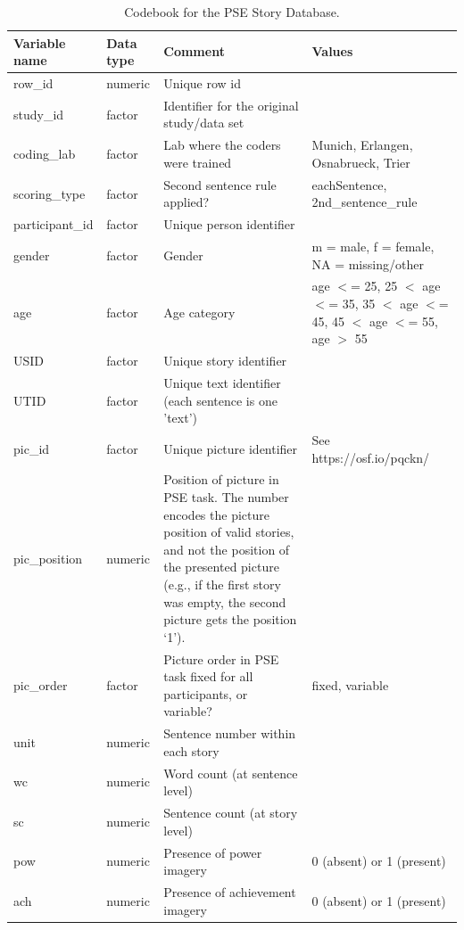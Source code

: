 \documentclass[man,a4paper,mask]{apa6}\usepackage[]{graphicx}\usepackage[]{color}
\begin{document}
\begin{table}
\begin{threeparttable}
		\caption{Codebook for the PSE Story Database.}
		\label{tab:codebook}
		\footnotesize
		\begin{tabularx}{\textwidth}{llXX}
		\toprule
Variable name & Data type & Comment & Values \\ 
  \hline
row\_id & numeric & Unique row id &  \\ 
  study\_id & factor & Identifier for the original study/data set &  \\ 
  coding\_lab & factor & Lab where the coders were trained & Munich, Erlangen, Osnabrueck, Trier \\ 
  scoring\_type & factor & Second sentence rule applied? & eachSentence, 2nd\_sentence\_rule \\ 
  participant\_id & factor & Unique person identifier &  \\ 
  gender & factor & Gender & m = male, f = female, NA = missing/other \\ 
  age & factor & Age category & age $<$= 25, 25 $<$ age $<$= 35, 35 $<$ age $<$= 45, 45 $<$ age $<$= 55, age $>$ 55 \\ 
  USID & factor & Unique story identifier &  \\ 
  UTID & factor & Unique text identifier (each sentence is one 'text') &  \\ 
  pic\_id & factor & Unique picture identifier & See https://osf.io/pqckn/ \\ 
  pic\_position & numeric & Position of picture in PSE task. The number encodes the picture position of valid stories, and not the position of the presented picture (e.g., if the first story was empty, the second picture gets the position `1'). &  \\ 
  pic\_order & factor & Picture order in PSE task fixed for all participants, or variable? & fixed, variable \\ 
  unit & numeric & Sentence number within each story &  \\ 
  wc & numeric & Word count (at sentence level) &  \\ 
  sc & numeric & Sentence count (at story level) &  \\ 
  pow & numeric & Presence of power imagery & 0 (absent) or 1 (present) \\ 
  ach & numeric & Presence of achievement imagery & 0 (absent) or 1 (present) \\ 

\end{tabularx}
\end{threeparttable}
\end{table}
\end{document}
